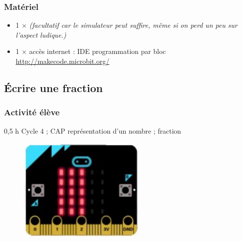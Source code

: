 \subsubsection{Matériel}
\begin{itemize}
    \item 1 $\times$ \matosMb \emph{(facultatif car le simulateur peut suffire, même si on perd un peu sur l'aspect ludique.)}
    \item 1 $\times$ accès internet : IDE programmation par bloc \url{http://makecode.microbit.org/}
\end{itemize}



%
%
\newpage
\subsection{Écrire une fraction}
\subsubsection{Activité élève}

\cartouche
{0,5 h}
{Cycle 4 ; CAP}
{représentation d'un nombre ; fraction}
{}
{}




%
%

\begin{figure}
    \includegraphics[width=\linewidth]{res/mb-fraction-mini.png}
\end{figure}




